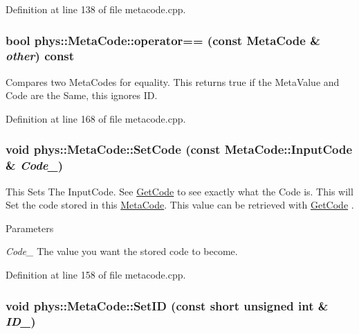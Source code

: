 Definition at line 138 of file metacode.cpp.\hypertarget{classphys_1_1MetaCode_a506486e5a6f08d50a5af42fa6d48a7f5}{
\subsubsection[{operator==}]{\setlength{\rightskip}{0pt plus 5cm}bool phys::MetaCode::operator== (const {\bf MetaCode} \& {\em other}) const}}
\label{da/dc9/classphys_1_1MetaCode_a506486e5a6f08d50a5af42fa6d48a7f5}


Compares two MetaCodes for equality. This returns true if the MetaValue and Code are the Same, this ignores ID. 

Definition at line 168 of file metacode.cpp.\hypertarget{classphys_1_1MetaCode_ab6759fbee9d039cf248bf76dde0f33dd}{
\subsubsection[{SetCode}]{\setlength{\rightskip}{0pt plus 5cm}void phys::MetaCode::SetCode (const {\bf MetaCode::InputCode} \& {\em Code\_\-})}}
\label{da/dc9/classphys_1_1MetaCode_ab6759fbee9d039cf248bf76dde0f33dd}


This Sets The InputCode. See \hyperlink{classphys_1_1MetaCode_a5835a05391cbb5a3dc83534a7bcf87d3}{GetCode} to see exactly what the Code is. This will Set the code stored in this \hyperlink{classphys_1_1MetaCode}{MetaCode}. This value can be retrieved with \hyperlink{classphys_1_1MetaCode_a5835a05391cbb5a3dc83534a7bcf87d3}{GetCode} . 
\begin{DoxyParams}{Parameters}
\item[{\em Code\_\-}]The value you want the stored code to become. \end{DoxyParams}


Definition at line 158 of file metacode.cpp.\hypertarget{classphys_1_1MetaCode_a0ef70c11c06f0e3015121985cb1b6153}{
\subsubsection[{SetID}]{\setlength{\rightskip}{0pt plus 5cm}void phys::MetaCode::SetID (const short unsigned int \& {\em ID\_\-})}}
\label{da/dc9/classphys_1_1MetaCode_a0ef70c11c06f0e3015121985cb1b6153}


